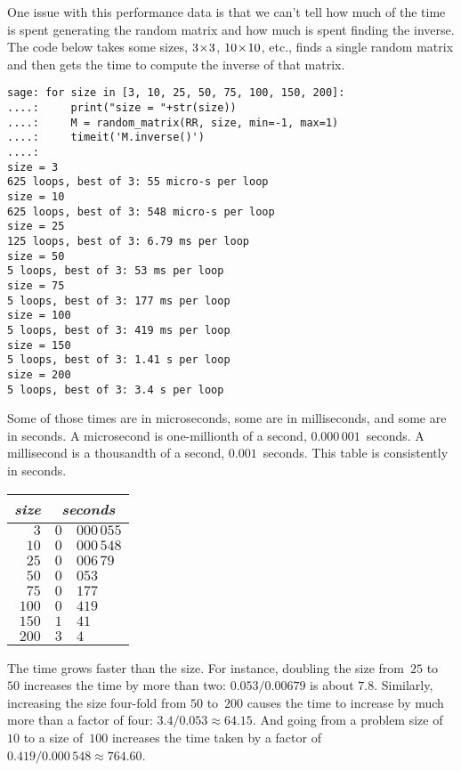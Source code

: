 One issue with this performance data is that
we can't tell
how much of the time is spent generating
the random matrix and how much is spent finding the inverse.
The code below takes some sizes, $3 \! \times \! 3$, $10 \! \times \! 10$, etc.,
finds a single random matrix and then 
gets the time to compute the inverse of that matrix.
\begin{lstlisting}
sage: for size in [3, 10, 25, 50, 75, 100, 150, 200]:
....:     print("size = "+str(size))
....:     M = random_matrix(RR, size, min=-1, max=1)
....:     timeit('M.inverse()')
....:     
size = 3
625 loops, best of 3: 55 micro-s per loop
size = 10
625 loops, best of 3: 548 micro-s per loop
size = 25
125 loops, best of 3: 6.79 ms per loop
size = 50
5 loops, best of 3: 53 ms per loop
size = 75
5 loops, best of 3: 177 ms per loop
size = 100
5 loops, best of 3: 419 ms per loop
size = 150
5 loops, best of 3: 1.41 s per loop
size = 200
5 loops, best of 3: 3.4 s per loop
\end{lstlisting}
Some of those times are in microseconds, some are in milliseconds, and some
are in seconds.
A microsecond is one-millionth of a second,
$0.000\,001$~seconds.
A millisecond is a thousandth of a second,
$0.001$~seconds.
This table is consistently in seconds.
\begin{center}
  \begin{tabular}{r|r@{.}l}
    \multicolumn{1}{r}{\textit{size}}     &\multicolumn{2}{c}{\textit{seconds}}  \\  \hline
    $3$      &$0$ &$000\,055$ \\
    $10$     &$0$ &$000\,548$ \\
    $25$     &$0$ &$006\,79$ \\
    $50$     &$0$ &$053$ \\
    $75$     &$0$ &$177$ \\
    $100$    &$0$ &$419$ \\
    $150$    &$1$ &$41$ \\
    $200$    &$3$ &$4$ 
  \end{tabular}
\end{center}
The time grows faster than the size.
For instance, doubling the size from~$25$ to~$50$ increases the time by
more than two: $0.053/0.00679$ is about $7.8$.
Similarly, increasing the size four-fold from $50$ to~$200$ causes the time to 
increase by much more than a factor of four: $3.4/0.053\approx 64.15$.
And going from a problem size of~$10$ to a size of~$100$ 
increases the time taken by a factor of $0.419/0.000\,548\approx 764.60$. 

